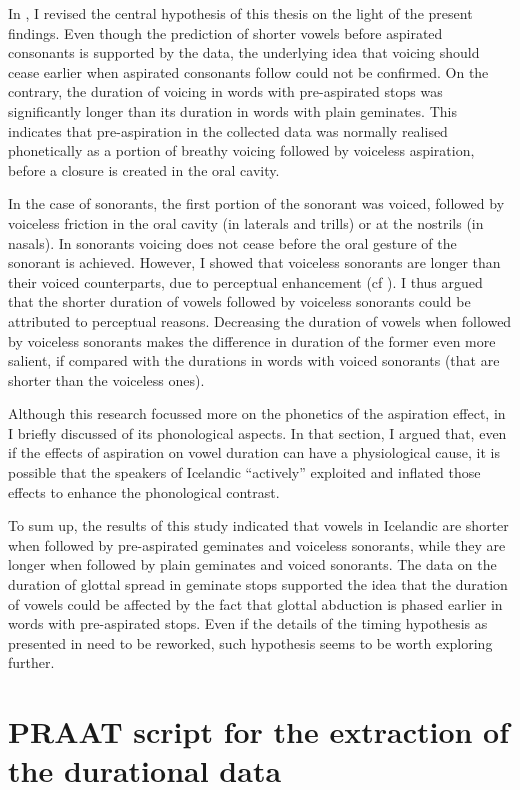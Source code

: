 \documentclass[11pt,a4paper,oneside,openany]{memoir}\usepackage[]{graphicx}\usepackage[]{color}
\begin{document}
In , I revised the central hypothesis of this thesis on the light of the present findings.
Even though the prediction of shorter vowels before aspirated consonants is supported by the data, the underlying idea that voicing should cease earlier when aspirated consonants follow could not be confirmed.
On the contrary, the duration of voicing in words with pre-aspirated stops was significantly longer than its duration in words with plain geminates.
This indicates that pre-aspiration in the collected data was normally realised phonetically as a portion of breathy voicing followed by voiceless aspiration, before a closure is created in the oral cavity.

In the case of sonorants, the first portion of the sonorant was voiced, followed by voiceless friction in the oral cavity (in laterals and trills) or at the nostrils (in nasals).
In sonorants voicing does not cease before the oral gesture of the sonorant is achieved.
However, I showed that voiceless sonorants are longer than their voiced counterparts, due to perceptual enhancement (cf ).
I thus argued that the shorter duration of vowels followed by voiceless sonorants could be attributed to perceptual reasons.
Decreasing the duration of vowels when followed by voiceless sonorants makes the difference in duration of the former even more salient, if compared with the durations in words with voiced sonorants (that are shorter than the voiceless ones).

Although this research focussed more on the phonetics of the aspiration effect, in  I briefly discussed of its phonological aspects.
In that section, I argued that, even if the effects of aspiration on vowel duration can have a physiological cause, it is possible that the speakers of Icelandic ``actively'' exploited and inflated those effects to enhance the phonological contrast.

To sum up, the results of this study indicated that vowels in Icelandic are shorter when followed by pre-aspirated geminates and voiceless sonorants, while they are longer when followed by plain geminates and voiced sonorants.
The data on the duration of glottal spread in geminate stops supported the idea that the duration of vowels could be affected by the fact that glottal abduction is phased earlier in words with pre-aspirated stops.
Even if the details of the timing hypothesis as presented in  need to be reworked, such hypothesis seems to be worth exploring further.
 












\appendix



\chapter{PRAAT script for the extraction of the durational data}
\label{a:getmeasure}









\end{document}

